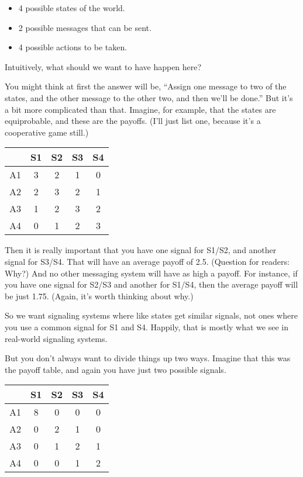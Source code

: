 \documentclass[
  11pt,
]{article}
\providecommand{\tightlist}{%
  \setlength{\itemsep}{0pt}\setlength{\parskip}{0pt}}
\begin{document}
\begin{itemize}
\tightlist
\item
  4 possible states of the world.
\item
  2 possible messages that can be sent.
\item
  4 possible actions to be taken.
\end{itemize}

Intuitively, what should we want to have happen here?

You might think at first the answer will be, ``Assign one message to two
of the states, and the other message to the other two, and then we'll be
done.'' But it's a bit more complicated than that. Imagine, for example,
that the states are equiprobable, and these are the payoffs. (I'll just
list one, because it's a cooperative game still.)

\begin{longtable}[]{@{}ccccc@{}}
\toprule
& S1 & S2 & S3 & S4 \\
\midrule
\endhead
A1 & 3 & 2 & 1 & 0 \\
A2 & 2 & 3 & 2 & 1 \\
A3 & 1 & 2 & 3 & 2 \\
A4 & 0 & 1 & 2 & 3 \\
\bottomrule
\end{longtable}

Then it is really important that you have one signal for S1/S2, and
another signal for S3/S4. That will have an average payoff of 2.5.
(Question for readers: Why?) And no other messaging system will have as
high a payoff. For instance, if you have one signal for S2/S3 and
another for S1/S4, then the average payoff will be just 1.75. (Again,
it's worth thinking about why.)

So we want signaling systems where like states get similar signals, not
ones where you use a common signal for S1 and S4. Happily, that is
mostly what we see in real-world signaling systems.

But you don't always want to divide things up two ways. Imagine that
this was the payoff table, and again you have just two possible signals.

\begin{longtable}[]{@{}ccccc@{}}
\toprule
& S1 & S2 & S3 & S4 \\
\midrule
\endhead
A1 & 8 & 0 & 0 & 0 \\
A2 & 0 & 2 & 1 & 0 \\
A3 & 0 & 1 & 2 & 1 \\
A4 & 0 & 0 & 1 & 2 \\
\bottomrule
\end{longtable}
\end{document}

